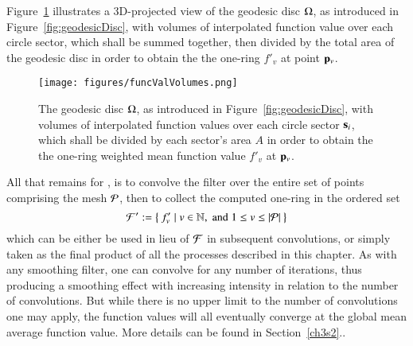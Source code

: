 Figure~\ref{fig:funcValVolumes} illustrates a 3D-projected view of the geodesic disc $\Omega$, as introduced in Figure~\ref{fig:geodesicDisc}, with volumes of interpolated function value over each circle sector, which shall be summed together, then divided by the total area of the geodesic disc in order to obtain the the one-ring \wmfv{} $f'_v$ at point $\bp_v$.

\begin{figure}[ht]
\ffigbox
	{\texttt{[image: figures/funcValVolumes.png]}}
	{\caption[Weighted Mean Function Value $f'_v$at $\bp_v$]{The geodesic disc $\Omega$, as introduced in Figure~\ref{fig:geodesicDisc}, with volumes of interpolated function values over each circle sector $\mathbf{s}_i$, which shall be divided by each sector's area $A$ in order to obtain the the one-ring weighted mean function value $f'_v$ at $\bp_v$.}\label{fig:funcValVolumes}}
\end{figure}

All that remains for , is to convolve the filter over the entire set of points comprising the mesh $\mathcal{P}$, then to collect the computed one-ring  in the ordered set
%
\begin{equation}
	\mathcal{F}' :=  \left \{\:f'_v \mid v \in \mathbb{N}, \;\text{and}\; 1\leq v \leq |\mathcal{P}|\:\right \}
	\label{eq:zeta}
\end{equation}%
%
%
which can be either be used in lieu of $\mathcal{F}$ in subsequent convolutions, or simply taken as the final product of all the processes described in this chapter. As with any smoothing filter, one can convolve  for any number of iterations, thus producing a smoothing effect with increasing intensity in relation to the number of convolutions. But while there is no upper limit to the number of convolutions one may apply, the function values will all eventually converge at the global mean average function value. More details can be found in Section~\ref{ch3s2}..

%
%
%
%
